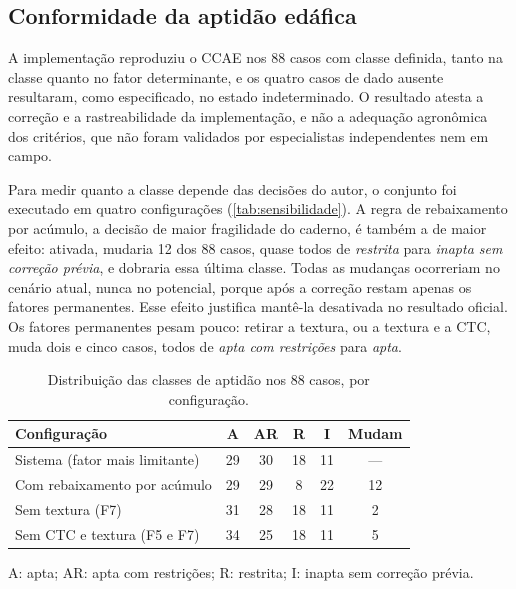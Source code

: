 \subsection{Conformidade da aptidão edáfica}\label{sec:res_aptidao}

A implementação reproduziu o CCAE nos 88 casos com classe definida, tanto na classe quanto no
fator determinante, e os quatro casos de dado ausente resultaram, como especificado, no estado
indeterminado. O resultado atesta a correção e a rastreabilidade da implementação, e não a
adequação agronômica dos critérios, que não foram validados por especialistas independentes nem em
campo.

Para medir quanto a classe depende das decisões do autor, o conjunto foi executado em quatro
configurações (\autoref{tab:sensibilidade}). A regra de rebaixamento por acúmulo, a decisão de
maior fragilidade do caderno, é também a de maior efeito: ativada, mudaria 12 dos 88 casos, quase
todos de \emph{restrita} para \emph{inapta sem correção prévia}, e dobraria essa última classe.
Todas as mudanças ocorreriam no cenário atual, nunca no potencial, porque após a correção restam
apenas os fatores permanentes. Esse efeito justifica mantê-la desativada no resultado oficial.
Os fatores permanentes pesam pouco: retirar a textura, ou a textura e a CTC, muda dois e cinco
casos, todos de \emph{apta com restrições} para \emph{apta}.

\begin{table}[htb]
\centering
\caption{Distribuição das classes de aptidão nos 88 casos, por configuração.}
\label{tab:sensibilidade}
\footnotesize
\begin{tabularx}{\columnwidth}{@{}Lccccc@{}}
\toprule
\textbf{Configuração} & \textbf{A} & \textbf{AR} & \textbf{R} & \textbf{I} & \textbf{Mudam} \\
\midrule
Sistema (fator mais limitante) & 29 & 30 & 18 & 11 & --- \\
Com rebaixamento por acúmulo   & 29 & 29 &  8 & 22 & 12 \\
Sem textura (F7)               & 31 & 28 & 18 & 11 &  2 \\
Sem CTC e textura (F5 e F7)    & 34 & 25 & 18 & 11 &  5 \\
\bottomrule
\end{tabularx}

\vspace{2pt}
\raggedright\scriptsize A: apta; AR: apta com restrições; R: restrita; I: inapta sem correção prévia.
\end{table}

